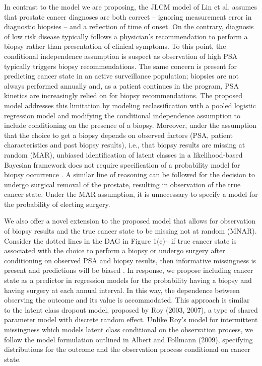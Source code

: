 \documentclass[12pt, letterpaper]{article}
\begin{document}
In contrast to the model we are proposing, the JLCM model of Lin et al. assumes that prostate cancer diagnoses are both correct -- ignoring measurement error in diagnostic biopsies -- and a reflection of time of onset. On the contrary, diagnosis of low risk disease typically follows a physician's recommendation to perform a biopsy rather than presentation of clinical symptoms. To this point, the conditional independence assumption is suspect as observation of high PSA typically triggers biopsy recommendations. The same concern is present for predicting cancer state in an active surveillance population; biopsies are not always performed annually and, as a patient continues in the program, PSA kinetics are increasingly relied on for biopsy recommendations. The proposed model addresses this limitation by modeling reclassification with a pooled logistic regression model \cite{Cupples1988, D'Agostino1990} and modifying the conditional independence assumption to include conditioning on the presence of a biopsy. Moreover, under the assumption that the choice to get a biopsy depends on observed factors (PSA, patient characteristics and past biopsy results), i.e., that biopsy results are missing at random (MAR), unbiased identification of latent classes in a likelihood-based Bayesian framework does not require specification of a probability model for biopsy occurrence \cite{Little2014}. A similar line of reasoning can be followed for the decision to undergo surgical removal of the prostate, resulting in observation of the true cancer state. Under the MAR assumption, it is unnecessary to specify a model for the probability of electing surgery. 

We also offer a novel extension to the proposed model that allows for observation of biopsy results and the true cancer state to be missing not at random (MNAR). Consider the dotted lines in the DAG in Figure 1(c)-- if true cancer state is associated with the choice to perform a biopsy or undergo surgery after conditioning on observed PSA and biopsy results, then informative missingness is present and predictions will be biased \cite{Wu1988}. In response, we propose including cancer state as a predictor in regression models for the probability having a biopsy and having surgery at each annual interval. In this way, the dependence between observing the outcome and its value is accommodated.
This approach is similar to the latent class dropout model, proposed by Roy (2003, 2007)\nocite{Roy2003,Roy2007}, a type of shared parameter model \cite{Follmann1995} with discrete random effect. Unlike Roy's model for intermittent missingness which models latent class conditional on the observation process, we follow the model formulation outlined in Albert and Follmann (2009)\nocite{Albert2009}, specifying distributions for the outcome and the observation process conditional on cancer state.
\end{document}

